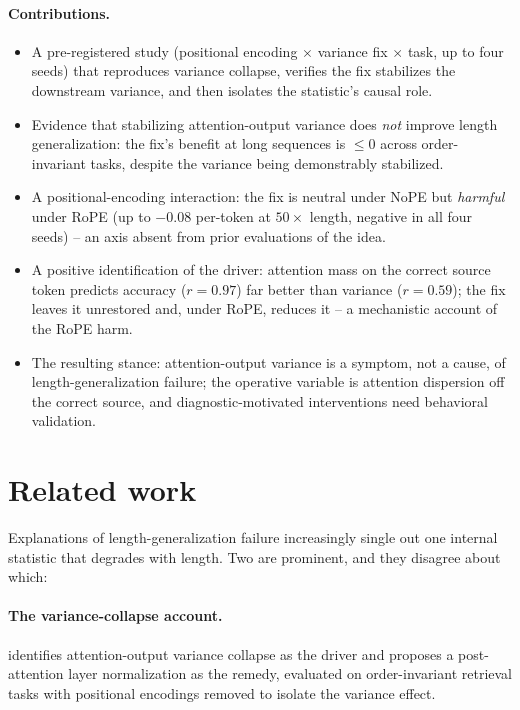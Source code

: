 \documentclass[11pt]{article}
\begin{document}
\paragraph{Contributions.}
\begin{itemize}\itemsep2pt
\item A pre-registered study (positional encoding $\times$ variance fix $\times$ task, up to four seeds)
that reproduces variance collapse, verifies the fix stabilizes the downstream variance, and then isolates
the statistic's causal role.
\item Evidence that stabilizing attention-output variance does \emph{not} improve length generalization:
the fix's benefit at long sequences is $\le 0$ across order-invariant tasks, despite the variance being
demonstrably stabilized.
\item A positional-encoding interaction: the fix is neutral under NoPE but \emph{harmful} under RoPE
(up to $-0.08$ per-token at $50\times$ length, negative in all four seeds) -- an axis absent from prior
evaluations of the idea.
\item A positive identification of the driver: attention mass on the correct source token predicts
accuracy ($r=0.97$) far better than variance ($r=0.59$); the fix leaves it unrestored and, under RoPE,
reduces it -- a mechanistic account of the RoPE harm.
\item The resulting stance: attention-output variance is a symptom, not a cause, of
length-generalization failure; the operative variable is attention dispersion off the correct source, and
diagnostic-motivated interventions need behavioral validation.
\end{itemize}

\section{Related work}
Explanations of length-generalization failure increasingly single out one internal statistic that
degrades with length. Two are prominent, and they disagree about which:

\paragraph{The variance-collapse account.} \cite{vanishingvariance} identifies attention-output variance
collapse as the driver and proposes a post-attention layer normalization as the remedy, evaluated on
order-invariant retrieval tasks with positional encodings removed to isolate the variance effect.
\end{document}
